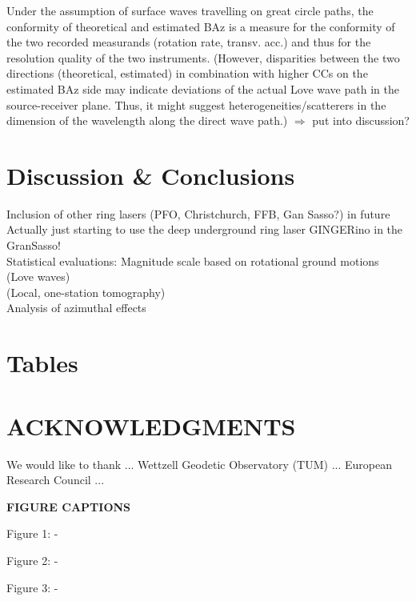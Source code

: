 \documentclass[12pt,reqno,letter]{article} %
\begin{document}
Under the assumption of surface waves travelling on great circle paths, the conformity of theoretical and estimated BAz is a measure for the conformity of the two recorded measurands (rotation rate, transv. acc.) and thus for the resolution quality of the two instruments. (However, disparities between the two directions (theoretical, estimated) in combination with higher CCs on the estimated BAz side may indicate deviations of the actual Love wave path in the source-receiver plane. Thus, it might suggest heterogeneities/scatterers in the dimension of the wavelength along the direct wave path.) $\Rightarrow$ put into discussion?\\

\section{Discussion \& Conclusions}
Inclusion of other ring lasers (PFO, Christchurch, FFB, Gan Sasso?) in future\\
Actually just starting to use the deep underground ring laser GINGERino in the GranSasso!\\
Statistical evaluations: 
Magnitude scale based on rotational ground motions (Love waves)\\
(Local, one-station tomography)\\
Analysis of azimuthal effects

\section*{Tables}


\section*{ACKNOWLEDGMENTS}
We would like to thank ... Wettzell Geodetic Observatory (TUM) ... European Research Council ... 



\label{Bibliography}

%
%




\newpage

\noindent
{\large \textbf{FIGURE CAPTIONS}}

\noindent
Figure 1: -

\noindent
Figure 2: -

\noindent
Figure 3: -


\noindent   
\noindent   
\end{document}
